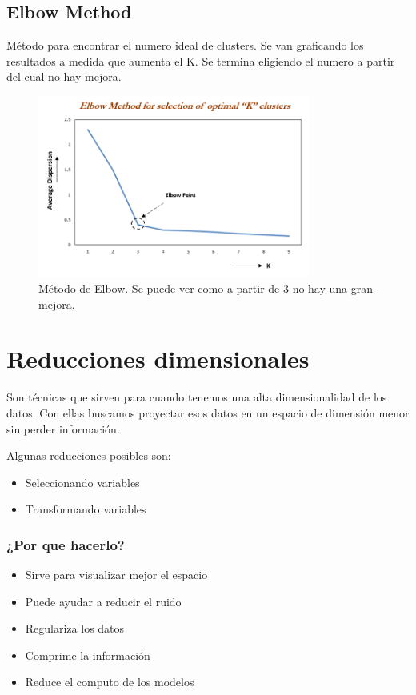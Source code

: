 \documentclass[titlepage,a4paper]{article}
\begin{document}
\subsection{Elbow Method}
Método para encontrar el numero ideal de clusters. Se van graficando los resultados a medida que aumenta el K. Se termina eligiendo el numero a partir del cual no hay mejora.

\begin{figure}[!htb]
    \centering
    \includegraphics[width=0.8\textwidth]{imagenesResumen/ElbowMethod.png}
    \caption{Método de Elbow. Se puede ver como a partir de 3 no hay una gran mejora.}
\end{figure}

\newpage

\section{Reducciones dimensionales}

Son técnicas que sirven para cuando tenemos una alta dimensionalidad de los datos. Con ellas buscamos proyectar esos datos en un espacio de dimensión menor sin perder información. 

Algunas reducciones posibles son:
\begin{itemize}
    \item Seleccionando variables
    \item Transformando variables
\end{itemize}

\subsubsection*{¿Por que hacerlo?}

\begin{itemize}
    \item Sirve para visualizar mejor el espacio
    \item Puede ayudar a reducir el ruido
    \item Regulariza los datos
    \item Comprime la información
    \item Reduce el computo de los modelos
\end{itemize}
\end{document}
